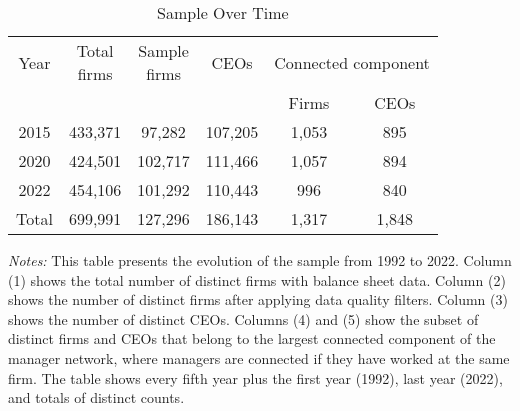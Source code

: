 \begin{table}[htbp]
\centering
\caption{Sample Over Time}
\label{tab:sample}
\begin{tabular}{*{6}{c}}
\toprule
Year & \shortstack{Total\\firms} & \shortstack{Sample\\firms} & CEOs & \multicolumn{2}{c}{Connected component} \\
\cmidrule(lr){5-6}
 & & & & Firms & CEOs \\
\midrule
2015 &      433,371 &       97,282 &      107,205 &        1,053 &          895 \\
2020 &      424,501 &      102,717 &      111,466 &        1,057 &          894 \\
2022 &      454,106 &      101,292 &      110,443 &          996 &          840 \\
\midrule
Total &      699,991 &      127,296 &      186,143 &        1,317 &        1,848 \\
\bottomrule
\end{tabular}
\begin{minipage}{12cm}
\footnotesize
\textit{Notes:} This table presents the evolution of the sample from 1992 to 2022. Column (1) shows the total number of distinct firms with balance sheet data. Column (2) shows the number of distinct firms after applying data quality filters. Column (3) shows the number of distinct CEOs. Columns (4) and (5) show the subset of distinct firms and CEOs that belong to the largest connected component of the manager network, where managers are connected if they have worked at the same firm. The table shows every fifth year plus the first year (1992), last year (2022), and totals of distinct counts. \end{minipage}
\end{table}
